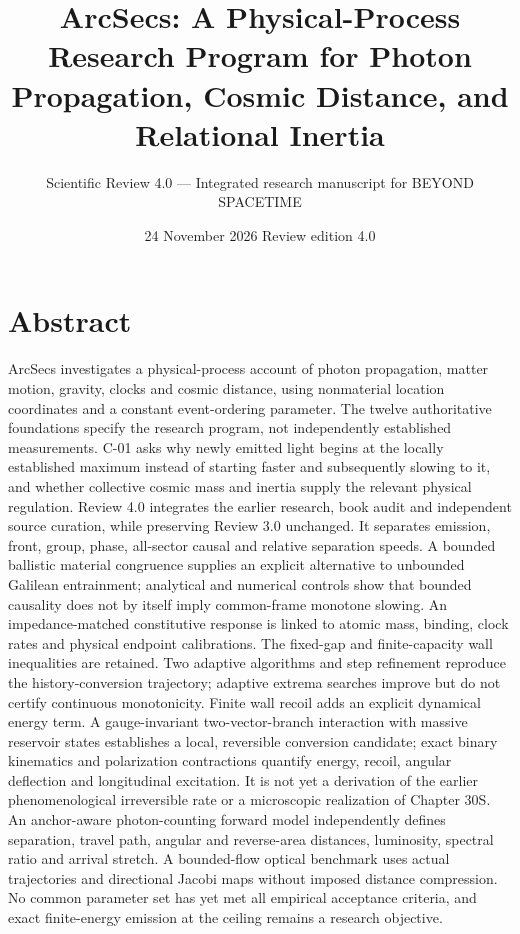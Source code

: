 \documentclass[
  11pt,
  twoside]{article}
\title{ArcSecs: A Physical-Process Research Program for Photon
Propagation, Cosmic Distance, and Relational Inertia}
\subtitle{Scientific Review 4.0 --- Integrated research manuscript for
BEYOND SPACETIME}
\author{}
\date{24 November 2026 \textbar{} Review edition 4.0}
\begin{document}
\maketitle

{
\setcounter{tocdepth}{2}
\tableofcontents
}
\newpage

\section{Abstract}\label{abstract}

ArcSecs investigates a physical-process account of photon propagation,
matter motion, gravity, clocks and cosmic distance, using nonmaterial
location coordinates and a constant event-ordering parameter. The twelve
authoritative foundations specify the research program, not
independently established measurements. C-01 asks why newly emitted
light begins at the locally established maximum instead of starting
faster and subsequently slowing to it, and whether collective cosmic
mass and inertia supply the relevant physical regulation. Review 4.0
integrates the earlier research, book audit and independent source
curation, while preserving Review 3.0 unchanged. It separates emission,
front, group, phase, all-sector causal and relative separation speeds. A
bounded ballistic material congruence supplies an explicit alternative
to unbounded Galilean entrainment; analytical and numerical controls
show that bounded causality does not by itself imply common-frame
monotone slowing. An impedance-matched constitutive response is linked
to atomic mass, binding, clock rates and physical endpoint calibrations.
The fixed-gap and finite-capacity wall inequalities are retained. Two
adaptive algorithms and step refinement reproduce the history-conversion
trajectory; adaptive extrema searches improve but do not certify
continuous monotonicity. Finite wall recoil adds an explicit dynamical
energy term. A gauge-invariant two-vector-branch interaction with
massive reservoir states establishes a local, reversible conversion
candidate; exact binary kinematics and polarization contractions
quantify energy, recoil, angular deflection and longitudinal excitation.
It is not yet a derivation of the earlier phenomenological irreversible
rate or a microscopic realization of Chapter 30S. An anchor-aware
photon-counting forward model independently defines separation, travel
path, angular and reverse-area distances, luminosity, spectral ratio and
arrival stretch. A bounded-flow optical benchmark uses actual
trajectories and directional Jacobi maps without imposed distance
compression. No common parameter set has yet met all empirical
acceptance criteria, and exact finite-energy emission at the ceiling
remains a research objective.
\end{document}
